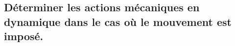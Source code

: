 \documentclass[10pt,fleqn]{article}
\newcommand{\repRel}{../..}
\newcommand{\repStyle}{\repRel/Style}
\newcommand{\td}{fichier_td}
\newcommand{\repExos}{\repRel/ExercicesCompetences}
\newcommand{\repExo}{dossier}
\begin{document}
\begin{multicols}{2} 

\renewcommand{\repExo}{\repExos/C2_MettreEnOeuvreDemarche/C2_07_PFS/01_T}
\renewcommand{\td}{01_T}
\graphicspath{{\repStyle/png/}{\repExo/images/}}


\renewcommand{\repExo}{\repExos/C2_MettreEnOeuvreDemarche/C2_07_PFS/02_R}
\renewcommand{\td}{02_R}
\graphicspath{{\repStyle/png/}{\repExo/images/}}


\renewcommand{\repExo}{\repExos/C2_MettreEnOeuvreDemarche/C2_07_PFS/14_Sympact}
\renewcommand{\td}{14_Sympact}
\graphicspath{{\repStyle/png/}{\repExo/images/}}


\renewcommand{\repExo}{\repExos/C2_MettreEnOeuvreDemarche/C2_07_PFS/515_Divers_Potence}
\renewcommand{\td}{515_Divers_Potence}
\graphicspath{{\repStyle/png/}{\repExo/images/}}


\renewcommand{\repExo}{\repExos/C2_MettreEnOeuvreDemarche/C2_07_PFS/55_Suspension}
\renewcommand{\td}{55_Suspension}
\graphicspath{{\repStyle/png/}{\repExo/images/}}


\renewcommand{\repExo}{\repExos/C2_MettreEnOeuvreDemarche/C2_07_PFS/56_RobotAvion}
\renewcommand{\td}{56_RobotAvion}
\graphicspath{{\repStyle/png/}{\repExo/images/}}


\renewcommand{\repExo}{\repExos/C2_MettreEnOeuvreDemarche/C2_07_PFS/57_PeseCamion}
\renewcommand{\td}{57_PeseCamion}
\graphicspath{{\repStyle/png/}{\repExo/images/}}


\renewcommand{\repExo}{\repExos/C2_MettreEnOeuvreDemarche/C2_07_PFS/57_PeseCamion_02}
\renewcommand{\td}{57_PeseCamion_02}
\graphicspath{{\repStyle/png/}{\repExo/images/}}


\renewcommand{\repExo}{\repExos/C2_MettreEnOeuvreDemarche/C2_07_PFS/64_EPAS}
\renewcommand{\td}{64_EPAS}
\graphicspath{{\repStyle/png/}{\repExo/images/}}


\end{multicols}

\subsection{Déterminer les actions mécaniques en dynamique dans le cas où le mouvement est imposé.} 
\end{document}
